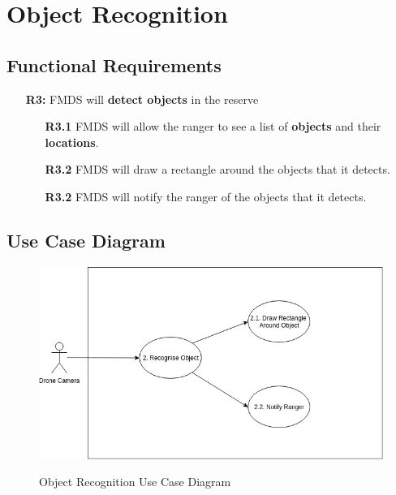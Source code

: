 \section{ Object Recognition }
\subsection{Functional Requirements}
	\begin{flushleft}
		\begin{itemize}
			\item  [\textbf{R3:}] FMDS will \textbf{detect objects} in the reserve

				\begin{itemize}
					\item [\textbf{R3.1}] FMDS will allow the ranger to see a list of \textbf{objects} and their \textbf{locations}.
					\item [\textbf{R3.2}] FMDS will draw a rectangle around the objects that it detects.
					\item [\textbf{R3.2}] FMDS will notify the ranger of the objects that it detects.
				\end{itemize}
		\end{itemize}
	\end{flushleft}

\subsection{Use Case Diagram}
\begin{flushleft}
	\begin{figure}[h!]
		\centering
		\includegraphics[scale=0.5]{./assets/images/object-recognition-ucd.jpg}
		\label{fig: object-recognition-ucd }
		\caption{Object Recognition Use Case Diagram}
	\end{figure}

\end{flushleft}

